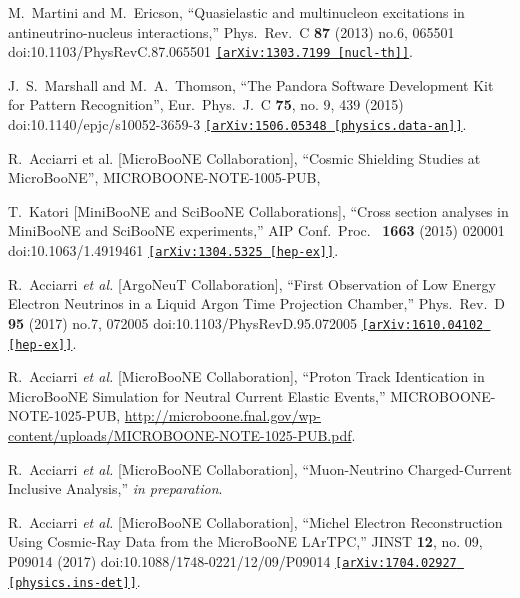 \begin{thebibliography}{99}
  M.~Martini and M.~Ericson,
  ``Quasielastic and multinucleon excitations in antineutrino-nucleus interactions,''
  Phys.\ Rev.\ C \textbf{87} (2013) no.6,  065501
  doi:10.1103/PhysRevC.87.065501
  \href{https://arxiv.org/abs/1303.7199}{\texttt{[arXiv:1303.7199 [nucl-th]]}}.
  
 
   J.~S.~Marshall and M.~A.~Thomson, 
  ``The Pandora Software Development Kit for Pattern Recognition'', Eur.\ Phys.\ J.\ C \textbf{75}, no. 9, 439 (2015) doi:10.1140/epjc/s10052-3659-3 \href{https://arxiv.org/abs/1506.05348}{\texttt{[arXiv:1506.05348 [physics.data-an]]}}.
 
   R.~Acciarri et al. [MicroBooNE Collaboration], ``Cosmic Shielding Studies at MicroBooNE'', MICROBOONE-NOTE-1005-PUB, \href{http://microboone.fnal.gov/wp-content/uploads/MICROBOONE-NOTE-1005-PUB.pdf}{}

  T.~Katori [MiniBooNE and SciBooNE Collaborations],
  ``Cross section analyses in MiniBooNE and SciBooNE experiments,''
  AIP Conf.\ Proc.\  \textbf{ 1663} (2015) 020001
  doi:10.1063/1.4919461
  \href{https://arxiv.org/abs/1304.5325}{\texttt{[arXiv:1304.5325 [hep-ex]]}}.
  
  R.~Acciarri \emph{et al.} [ArgoNeuT Collaboration],
  ``First Observation of Low Energy Electron Neutrinos in a Liquid Argon Time Projection Chamber,''
  Phys.\ Rev.\ D \textbf{ 95} (2017) no.7,  072005
  doi:10.1103/PhysRevD.95.072005
  \href{https://arxiv.org/abs/1610.04102}{\texttt{[arXiv:1610.04102 [hep-ex]]}}.
  
  R.~Acciarri \emph{et al.} [MicroBooNE Collaboration],
  ``Proton Track Identication in MicroBooNE Simulation for Neutral Current Elastic Events,'' MICROBOONE-NOTE-1025-PUB,
  \url{http://microboone.fnal.gov/wp-content/uploads/MICROBOONE-NOTE-1025-PUB.pdf}.

  R.~Acciarri \emph{et al.} [MicroBooNE Collaboration],
  ``Muon-Neutrino Charged-Current Inclusive Analysis,'' \emph{in preparation}.

  R.~Acciarri {\it et al.} [MicroBooNE Collaboration],
  ``Michel Electron Reconstruction Using Cosmic-Ray Data from the MicroBooNE LArTPC,''
  JINST {\bf 12}, no. 09, P09014 (2017)
  doi:10.1088/1748-0221/12/09/P09014
  \href{https://arxiv.org/abs/1704.02927}{\texttt{[arXiv:1704.02927 [physics.ins-det]]}}.


\end{thebibliography}
